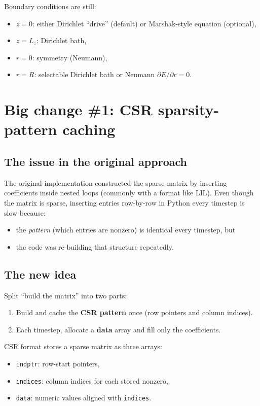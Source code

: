 \documentclass[11pt]{article}
\begin{document}
Boundary conditions are still:
\begin{itemize}
  \item $z=0$: either Dirichlet ``drive'' (default) or Marshak-style equation (optional),
  \item $z=L_z$: Dirichlet bath,
  \item $r=0$: symmetry (Neumann),
  \item $r=R$: selectable Dirichlet bath or Neumann $\partial E/\partial r=0$.
\end{itemize}

\section*{Big change \#1: CSR sparsity-pattern caching}
\subsection*{The issue in the original approach}
The original implementation constructed the sparse matrix by inserting coefficients inside nested loops (commonly with a format like LIL). Even though the matrix is sparse, inserting entries row-by-row in Python every timestep is slow because:
\begin{itemize}
  \item the \emph{pattern} (which entries are nonzero) is identical every timestep, but
  \item the code was re-building that structure repeatedly.
\end{itemize}

\subsection*{The new idea}
Split ``build the matrix'' into two parts:
\begin{enumerate}
  \item Build and cache the \textbf{CSR pattern} once (row pointers and column indices).
  \item Each timestep, allocate a \textbf{data} array and fill only the coefficients.
\end{enumerate}

CSR format stores a sparse matrix as three arrays:
\begin{itemize}
  \item \texttt{indptr}: row-start pointers,
  \item \texttt{indices}: column indices for each stored nonzero,
  \item \texttt{data}: numeric values aligned with \texttt{indices}.
\end{itemize}
\end{document}
